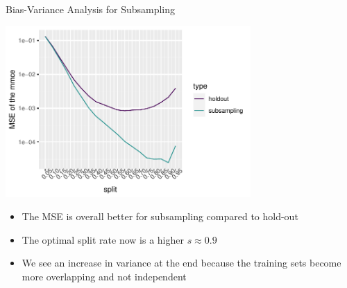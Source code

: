 \documentclass[11pt,compress,t,notes=noshow, xcolor=table]{beamer}
\begin{document}
\begin{vbframe}{Bias-Variance Analysis for Subsampling}
\begin{center}
\includegraphics[width=0.7\textwidth]{figure/eval-resampling-example-2}
\end{center}


\begin{itemize}
  \item The MSE is overall better for subsampling compared to hold-out
  \item The optimal split rate now is a higher $s \approx 0.9$
  \item We see an increase in variance at the end because the training sets become more overlapping and not independent
\end{itemize}
\end{vbframe}

\end{document}
